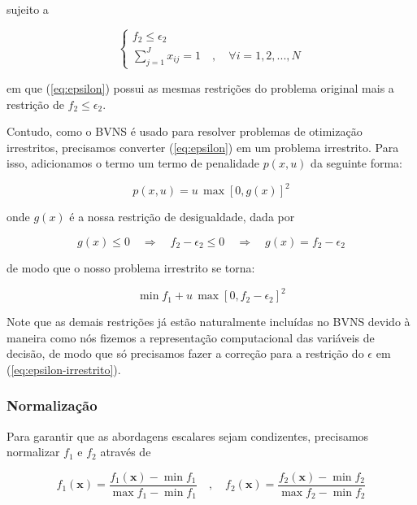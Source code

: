 \documentclass[conference]{IEEEtran}
\begin{document}
\noindent sujeito a 

\begin{equation} \label{eq:rest-epsilon}
    \begin{cases}
      f_2 \leq \epsilon_2 \\
      \sum_{j=1}^{J} x_{ij} = 1 \quad , \quad \forall i = {1, 2, ..., N}
    \end{cases}       
\end{equation}

\noindent em que (\ref{eq:epsilon}) possui as mesmas restrições do problema original
mais a restrição de $f_2 \leq \epsilon_2$.

Contudo, como o BVNS é usado para resolver problemas de otimização irrestritos, 
precisamos converter (\ref{eq:epsilon}) em um problema irrestrito. Para isso, adicionamos o 
termo um termo de penalidade $p(x, u)$ da seguinte forma:

\[ p(x, u) = u \, \max \left[ 0, g(x) \right] ^2 \]

\noindent onde $g(x)$ é a nossa restrição de desigualdade, dada por 

\[ g(x) \leq 0 \quad \Longrightarrow \quad f_2 - \epsilon_2 \leq 0 \quad \Longrightarrow \quad g(x) = f_2 - \epsilon_2 \]

\noindent de modo que o nosso problema irrestrito se torna:  


\begin{equation}\label{eq:epsilon-irrestrito}
	\min f_1 + u \, \max \left[ 0, f_2 - \epsilon_2 \right] ^2
\end{equation}

Note que as demais restrições já estão naturalmente incluídas no BVNS devido 
à maneira como nós fizemos a representação computacional das variáveis de decisão, 
de modo que só precisamos fazer a correção para a restrição do $\epsilon$
em (\ref{eq:epsilon-irrestrito}).



\subsubsection{Normalização}

Para garantir que as abordagens escalares sejam condizentes, precisamos normalizar $f_1$ e $f_2$ 
através de 

\begin{equation} \label{eq:normalizacao}
	f_1(\mathbf{x}) = \frac{f_1(\mathbf{x}) - \min f_1}{\max f_1 - \min f_1}
	\quad , \quad 
	f_2(\mathbf{x}) = \frac{f_2(\mathbf{x}) - \min f_2}{\max f_2 - \min f_2}       
\end{equation}
\end{document}
